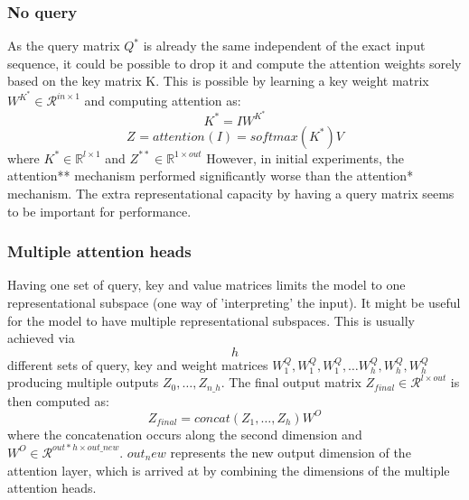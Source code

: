 \subsubsection{No query} \label{subsubsec:noquery}
As the query matrix ${Q}^*$ is already the same independent of the exact input sequence, it could be possible to drop it and compute the attention weights sorely based on the key matrix K.
This is possible by learning a key weight matrix $W^{K^*} \in \mathcal{R}^{in \times 1}$ and computing attention as:
$$K^* = IW^{K^*}$$
$$Z^{} = {attention}^{}(I) = softmax(K^*)V$$
where $K^* \in \mathbb{R}^{l \times 1}$ and $Z^{**} \in \mathbb{R}^{1 \times out}$
However, in initial experiments, the attention** mechanism performed significantly worse than the attention* mechanism. The extra representational capacity by having a query matrix seems to be important for performance.
\subsubsection{Multiple attention heads} \label{subsubsec:heads}
Having one set of query, key and value matrices limits the model to one representational subspace (one way of 'interpreting' the input). It might be useful for the model to have multiple representational subspaces. This is usually achieved via $$h$$ different sets of query, key and weight matrices $W^Q_1, W^Q_1, W^Q_1, \dots W^Q_{h}, W^Q_{h},W^Q_{h}$ producing multiple outputs $Z_0, \dots, Z_{n\_h}$.
The final output matrix $Z_{final} \in \mathcal{R}^{l \times out}$ is then computed as:
$$Z_{final} = concat(Z_1, \dots, Z_{h}) W^O$$
where the concatenation occurs along the second dimension and $W^O \in \mathcal{R}^{out * h \times out\_new}$. $out_new$ represents the new output dimension of the attention layer, which is arrived at by combining the dimensions of the multiple attention heads.


